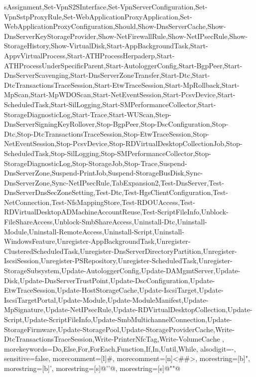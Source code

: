 {{sAssignment,Set-VpnS2SInterface,Set-VpnServerConfiguration,Set-VpnSstpProxyRule,Set-WebApplicationProxyApplication,Set-WebApplicationProxyConfiguration,Should,Show-DnsServerCache,Show-DnsServerKeyStorageProvider,Show-NetFirewallRule,Show-NetIPsecRule,Show-StorageHistory,Show-VirtualDisk,Start-AppBackgroundTask,Start-AppvVirtualProcess,Start-ATHProcessHerpaderp,Start-ATHProcessUnderSpecificParent,Start-AutologgerConfig,Start-BgpPeer,Start-DnsServerScavenging,Start-DnsServerZoneTransfer,Start-Dtc,Start-DtcTransactionsTraceSession,Start-EtwTraceSession,Start-MpRollback,Start-MpScan,Start-MpWDOScan,Start-NetEventSession,Start-PcsvDevice,Start-ScheduledTask,Start-SilLogging,Start-SMPerformanceCollector,Start-StorageDiagnosticLog,Start-Trace,Start-WUScan,Step-DnsServerSigningKeyRollover,Stop-BgpPeer,Stop-DscConfiguration,Stop-Dtc,Stop-DtcTransactionsTraceSession,Stop-EtwTraceSession,Stop-NetEventSession,Stop-PcsvDevice,Stop-RDVirtualDesktopCollectionJob,Stop-ScheduledTask,Stop-SilLogging,Stop-SMPerformanceCollector,Stop-StorageDiagnosticLog,Stop-StorageJob,Stop-Trace,Suspend-DnsServerZone,Suspend-PrintJob,Suspend-StorageBusDisk,Sync-DnsServerZone,Sync-NetIPsecRule,TabExpansion2,Test-DnsServer,Test-DnsServerDnsSecZoneSetting,Test-Dtc,Test-HgsClientConfiguration,Test-NetConnection,Test-NfsMappingStore,Test-RDOUAccess,Test-RDVirtualDesktopADMachineAccountReuse,Test-ScriptFileInfo,Unblock-FileShareAccess,Unblock-SmbShareAccess,Uninstall-Dtc,Uninstall-Module,Uninstall-RemoteAccess,Uninstall-Script,Uninstall-WindowsFeature,Unregister-AppBackgroundTask,Unregister-ClusteredScheduledTask,Unregister-DnsServerDirectoryPartition,Unregister-IscsiSession,Unregister-PSRepository,Unregister-ScheduledTask,Unregister-StorageSubsystem,Update-AutologgerConfig,Update-DAMgmtServer,Update-Disk,Update-DnsServerTrustPoint,Update-DscConfiguration,Update-EtwTraceSession,Update-HostStorageCache,Update-IscsiTarget,Update-IscsiTargetPortal,Update-Module,Update-ModuleManifest,Update-MpSignature,Update-NetIPsecRule,Update-RDVirtualDesktopCollection,Update-Script,Update-ScriptFileInfo,Update-SmbMultichannelConnection,Update-StorageFirmware,Update-StoragePool,Update-StorageProviderCache,Write-DtcTransactionsTraceSession,Write-PrinterNfcTag,Write-VolumeCache
	},
	morekeywords={Do,Else,For,ForEach,Function,If,In,Until,While},
	alsodigit={-},
	sensitive=false,
	morecomment=[l]{\#},
	morecomment=[n]{<\#}{\#>},
	morestring=[b]{"},
	morestring=[b]{'},
	morestring=[s]{@'}{'@},
	morestring=[s]{@"}{"@}
}
